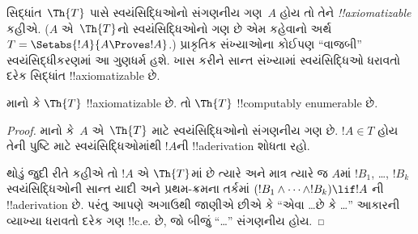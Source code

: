 \documentclass[../../../include/open-logic-section]{subfiles}
\begin{document}


સિદ્ધાંત~$\Th{T}$ પાસે
સ્વયંસિદ્ધિઓનો સંગણનીય ગણ~$A$
હોય તો તેને
\emph{!!{axiomatizable}} કહીએ.
($A$ એ~$\Th{T}$નો
સ્વયંસિદ્ધિઓનો ગણ છે એમ
કહેવાનો અર્થ
$T = \Setabs{!A}{A \Proves !A}$.)
પ્રાકૃતિક સંખ્યાઓના કોઈપણ
``વાજબી'' સ્વયંસિદ્ધીકરણમાં
આ ગુણધર્મ હશે. ખાસ કરીને
સાન્ત સંખ્યામાં સ્વયંસિદ્ધિઓ
ધરાવતો દરેક સિદ્ધાંત
!!{axiomatizable} છે.

\begin{lem}
માનો કે $\Th{T}$
!!{axiomatizable} છે.
તો $\Th{T}$
!!{computably
enumerable} છે.
\end{lem}

\begin{proof}
માનો કે~$A$ એ~$\Th{T}$
માટે સ્વયંસિદ્ધિઓનો
સંગણનીય ગણ છે.
$!A \in T$ હોય તેની
પુષ્ટિ માટે સ્વયંસિદ્ધિઓમાંથી
$!A$ની !!a{derivation}
શોધતા રહો.

થોડું જુદી રીતે કહીએ તો
$!A$ એ $\Th{T}$માં છે
ત્યારે અને માત્ર ત્યારે જ
$A$માં $!B_1$, \dots,
$!B_k$ સ્વયંસિદ્ધિઓની
સાન્ત યાદી અને પ્રથમ-ક્રમના
તર્કમાં
$(!B_1 \land \dots \land !B_k) \lif !A$
ની !!a{derivation} છે.
પરંતુ આપણે અગાઉથી જાણીએ
છીએ કે ``એવા \dots છે કે
\dots'' આકારની વ્યાખ્યા
ધરાવતો દરેક ગણ !!{c.e.}
છે, જો બીજું ``\dots''
સંગણનીય હોય.
\end{proof}
\end{document}
